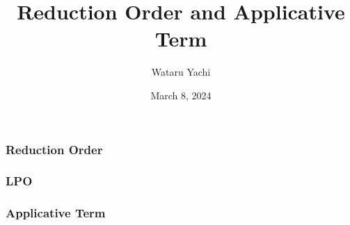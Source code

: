 \documentclass[12pt,aspectratio=169]{beamer}
\title{ Reduction Order and Applicative Term }
\author{Wataru Yachi}
\institute{JAIST}
\date{March 8, 2024}
\begin{document}
\maketitle

\begin{frame}
    \frametitle{Reduction Order}
\end{frame}

\begin{frame}
    \frametitle{LPO}
\end{frame}

\begin{frame}
    \frametitle{Applicative Term}
\end{frame}
\end{document}
